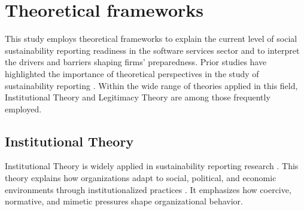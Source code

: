 \section{Theoretical frameworks}

This study employs theoretical frameworks to explain the current level 
of social sustainability reporting readiness in the software services sector 
and to interpret the drivers and barriers shaping firms' preparedness.
Prior studies have highlighted the importance of theoretical perspectives 
in the study of sustainability reporting \parencite{Gesso2023, Rezaee2016, Lozano2015}.
Within the wide range of theories applied in this field, Institutional Theory
and Legitimacy Theory are among those frequently employed.

\subsection{Institutional Theory}
Institutional Theory is widely applied in sustainability 
reporting research \parencite{Campbell2007}. This theory explains 
how organizations adapt to social, political, and economic environments 
through institutionalized practices 
\parencite{Meyer1977, DiMaggio1983}.
It emphasizes how coercive, normative, and mimetic pressures shape organizational behavior.


